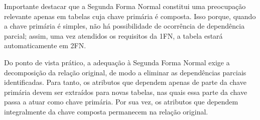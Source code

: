 Importante destacar que a Segunda Forma Normal constitui uma preocupação relevante apenas em tabelas cuja chave primária é composta. Isso porque, quando a chave primária é simples, não há possibilidade de ocorrência de dependência parcial; assim, uma vez atendidos os requisitos da 1FN, a tabela estará automaticamente em 2FN.

Do ponto de vista prático, a adequação à Segunda Forma Normal exige a decomposição da relação original, de modo a eliminar as dependências parciais identificadas. Para tanto, os atributos que dependem apenas de parte da chave primária devem ser extraídos para novas tabelas, nas quais essa parte da chave passa a atuar como chave primária. Por sua vez, os atributos que dependem integralmente da chave composta permanecem na relação original.\cite{angelotti2010banco}

